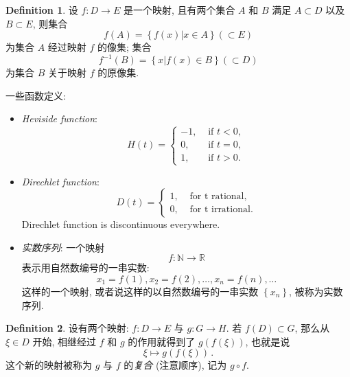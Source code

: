 \documentclass{book}
\newcommand{\set}[1]{\left\{#1\right\}}
\newcommand{\compose}{\circ}
\numberwithin{equation}{section}
\numberwithin{figure}{section}
\theoremstyle{definition}
\newtheorem{definition}{Definition}
\begin{document}
\begin{definition}
  设 $f:D\to E$ 是一个映射, 且有两个集合 $A$ 和 $B$ 满足 $A\subset D$ 以及 $B\subset E$, 则集合
  \begin{equation*}
    f(A)=\set{f(x)|x\in A}(\subset E)
  \end{equation*}
  为集合 $A$ 经过映射 $f$ 的像集; 集合
  \begin{equation*}
    f^{-1}(B)=\set{x|f(x)\in B}(\subset D)
  \end{equation*}
  为集合 $B$ 关于映射 $f$ 的原像集.
\end{definition}
一些函数定义:
\begin{itemize}
  \item \emph{Heviside function}:
\begin{equation*}
  H(t)=
  \begin{cases}
    -1,& \text{ if } t<0,\\
    0,& \text{ if } t=0,\\
    1,& \text{ if } t>0.
  \end{cases}
\end{equation*}
\item \emph{Direchlet function}:
  \begin{equation*}
  D(t)=
  \begin{cases}
    1,& \text{ for t rational,}\\
    0,& \text{ for t irrational.}
  \end{cases}
  \end{equation*}
Direchlet function is discontinuous everywhere.
\item \emph{实数序列}: 一个映射
  \begin{equation*}
    f:\mathbb{N}\to \mathbb{R}
  \end{equation*}
  表示用自然数编号的一串实数:
  \begin{equation*}
    x_1=f(1),x_2=f(2),\dots,x_n=f(n),\dots
  \end{equation*}
  这样的一个映射, 或者说这样的以自然数编号的一串实数 $\set{x_n}$, 被称为实数序列.
\end{itemize}

\begin{definition}
  设有两个映射: $f:D\to E$ 与 $g:G\to H$. 若 $f(D)\subset G$, 那么从 $\xi\in D$ 开始, 相继经过 $f$ 和 $g$ 的作用就得到了 $g(f(\xi))$, 也就是说
  \begin{equation*}
    \xi\mapsto g(f(\xi))\,.
  \end{equation*}
  这个新的映射被称为 $g$ 与 $f$ 的\emph{复合} (注意顺序), 记为 $g\compose f$.
\end{definition}
\end{document}

